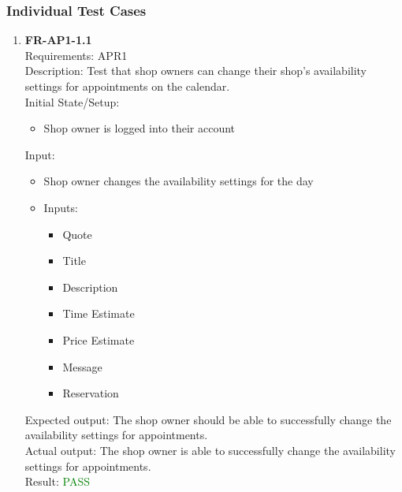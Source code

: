 \documentclass[12pt, titlepage]{article}
\newcommand{\testpass}{\textcolor{green}{PASS}}
\begin{document}
        \subsubsection{Individual Test Cases}
            \begin{enumerate}
                \item \textbf{FR-AP1-1.1} \label{FR-AP1-1.1} \\ Requirements: APR1 \\
                    Description: Test that shop owners can change their shop's availability settings for appointments on the calendar. \\
                    Initial State/Setup: \begin{itemize}
                        \item Shop owner is logged into their account
                    \end{itemize}
                    Input: \begin{itemize}
                        \item Shop owner changes the availability settings for the day
                        \item Inputs:
                            \begin{itemize}
                                \item Quote
                                \item Title
                                \item Description
                                \item Time Estimate
                                \item Price Estimate
                                \item Message
                                \item Reservation
                            \end{itemize}
                    \end{itemize}
                    Expected output: The shop owner should be able to successfully change the availability settings for appointments. \\
                    Actual output: The shop owner is able to successfully change the availability settings for appointments. \\
                    Result: \testpass
                    

\end{enumerate}
\end{document}
